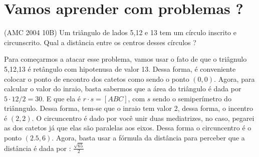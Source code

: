 \documentclass{article}
\begin{document}
\section{Vamos aprender com problemas ?}
\begin{tcolorbox}[colback=blue!5!white,colframe=blue!75!black,title=Problema 1]
(AMC 2004 10B) Um triângulo de lados 5,12 e 13 tem um círculo inscrito e circunscrito. Qual a distância entre os centros desses círculos ?
\end{tcolorbox}
\begin{center}
\end{center}
Para começarmos a atacar esse problema, vamos usar o fato de que o triâgnulo 5,12,13 é retângulo com hipotenusa de valor 13. Dessa forma, é conveniente colocar o ponto de encontro dos catetos como sendo o ponto $(0,0)$. Agora, para calcular o valor do inraio, basta sabermos que a  área do triângulo é dada por $5 \cdot 12 / 2 = 30$. E que ela é $r \cdot s = [ABC]$, com $s$ sendo o semiperímetro do triânngulo. Dessa forma, tem-se que o inraio tem valor 2, dessa forma, o incentro é $(2,2)$. O circuncentro é dado por você unir duas mediatrizes, no caso, pegarei as dos catetos já que elas são paralelas aos eixos. Dessa forma o circuncentro é o ponto $(2.5, 6)$. Agora, basta usar a fórmula da distância para perceber que a distância é dada por : $\frac{\sqrt{65}}{2}$
\end{document}
